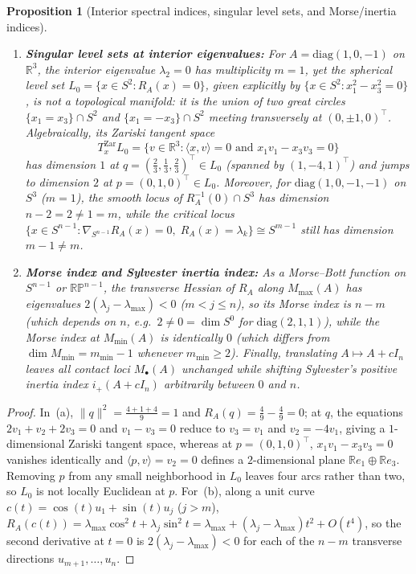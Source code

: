 \documentclass[11pt,a4paper]{article}
\newtheorem{proposition}[theorem]{Proposition}
\theoremstyle{definition}
\theoremstyle{remark}
\newcommand{\RR}{\mathbb{R}}
\newcommand{\RP}{\mathbb{RP}}
\newcommand{\diag}{\mathrm{diag}}
\begin{document}
\begin{proposition}[Interior spectral indices, singular level sets, and Morse/inertia indices]
\label{prop:interior_morse}\leavevmode
\begin{enumerate}
  \item[(a)] \textbf{Singular level sets at interior eigenvalues:} For $A = \diag(1, 0, -1)$ on $\RR^3$, the interior eigenvalue $\lambda_2 = 0$ has multiplicity $m = 1$, yet the spherical level set $L_0 = \{x \in S^2 : R_A(x) = 0\}$, given explicitly by $\{x \in S^2 : x_1^2 - x_3^2 = 0\}$, is \emph{not a topological manifold}: it is the union of two great circles $\{x_1 = x_3\} \cap S^2$ and $\{x_1 = -x_3\} \cap S^2$ meeting transversely at $(0, \pm 1, 0)^\top$. Algebraically, its Zariski tangent space
  \[
    T_x^{\mathrm{Zar}} L_0 = \{v \in \RR^3 : \langle x, v \rangle = 0 \text{ and } x_1 v_1 - x_3 v_3 = 0\}
  \]
  has dimension $1$ at $q = (\frac{2}{3}, \frac{1}{3}, \frac{2}{3})^\top \in L_0$ (spanned by $(1, -4, 1)^\top$) and jumps to dimension $2$ at $p = (0, 1, 0)^\top \in L_0$. Moreover, for $\diag(1, 0, -1, -1)$ on $S^3$ ($m = 1$), the smooth locus of $R_A^{-1}(0) \cap S^3$ has dimension $n - 2 = 2 \neq 1 = m$, while the critical locus $\{x \in S^{n-1} : \nabla_{S^{n-1}} R_A(x) = 0,\; R_A(x) = \lambda_k\} \cong S^{m-1}$ still has dimension $m - 1 \neq m$.
  \item[(b)] \textbf{Morse index and Sylvester inertia index:} As a Morse--Bott function on $S^{n-1}$ or $\RP^{n-1}$, the transverse Hessian of $R_A$ along $M_{\max}(A)$ has eigenvalues $2(\lambda_j - \lambda_{\max}) < 0$ ($m < j \le n$), so its Morse index is $n - m$ (which depends on $n$, e.g.\ $2 \neq 0 = \dim S^0$ for $\diag(2, 1, 1)$), while the Morse index at $M_{\min}(A)$ is identically $0$ (which differs from $\dim M_{\min} = m_{\min} - 1$ whenever $m_{\min} \ge 2$). Finally, translating $A \mapsto A + c I_n$ leaves all contact loci $M_{\bullet}(A)$ unchanged while shifting Sylvester's positive inertia index $i_+(A + c I_n)$ arbitrarily between $0$ and $n$.
\end{enumerate}
\end{proposition}

\begin{proof}
In~(a), $\|q\|^2 = \frac{4 + 1 + 4}{9} = 1$ and $R_A(q) = \frac{4}{9} - \frac{4}{9} = 0$; at $q$, the equations $2 v_1 + v_2 + 2 v_3 = 0$ and $v_1 - v_3 = 0$ reduce to $v_3 = v_1$ and $v_2 = -4 v_1$, giving a $1$-dimensional Zariski tangent space, whereas at $p = (0, 1, 0)^\top$, $x_1 v_1 - x_3 v_3 = 0$ vanishes identically and $\langle p, v \rangle = v_2 = 0$ defines a $2$-dimensional plane $\RR e_1 \oplus \RR e_3$. Removing $p$ from any small neighborhood in $L_0$ leaves four arcs rather than two, so $L_0$ is not locally Euclidean at $p$. For~(b), along a unit curve $c(t) = \cos(t) u_1 + \sin(t) u_j$ ($j > m$), $R_A(c(t)) = \lambda_{\max} \cos^2 t + \lambda_j \sin^2 t = \lambda_{\max} + (\lambda_j - \lambda_{\max}) t^2 + O(t^4)$, so the second derivative at $t = 0$ is $2(\lambda_j - \lambda_{\max}) < 0$ for each of the $n - m$ transverse directions $u_{m+1}, \dots, u_n$.
\end{proof}
\end{document}
